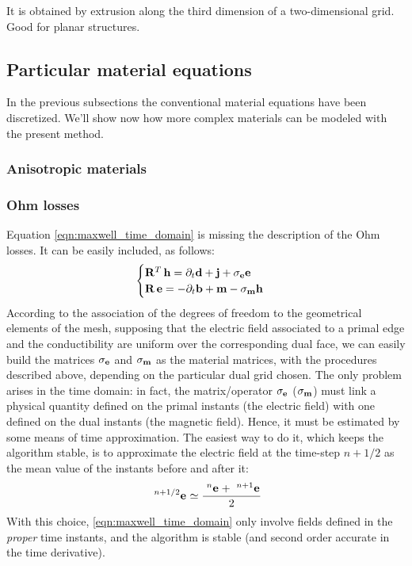 It is obtained by extrusion along the third dimension of a
two-dimensional grid. Good for planar structures.

\subsection{Particular material equations} \label{sec:particular_material_equations}

In the previous subsections the conventional material equations have
been discretized. We'll show now how more complex materials can be
modeled with the present method.

\subsubsection{Anisotropic materials}


\subsubsection{Ohm losses}

Equation \eqref{eqn:maxwell_time_domain} is missing the description of
the Ohm losses. It can be easily included, as follows:
\begin{equation*} \begin{cases}
  \Prod{\Transpose{\Matrix{R}}}{\Array{h}} = \partial_t \Array{d} + \Array{j} + \Matrix{\sigma_e} \Array{e} \\
  \Prod{\Matrix{R}}{\Array{e}} = -\partial_t \Array{b} + \Array{m} - \Matrix{\sigma_m} \Array{h}
\end{cases} \end{equation*}
According to the association of the degrees of freedom to the
geometrical elements of the mesh, supposing that the electric field
associated to a primal edge and the conductibility are uniform over the
corresponding dual face, we can easily build the matrices
$\Matrix{\sigma_e}$ and $\Matrix{\sigma_m}$ as the material matrices,
with the procedures described above, depending on the particular dual
grid chosen. The only problem arises in the time domain: in fact, the
matrix/operator $\Matrix{\sigma_e}$ ($\Matrix{\sigma_m}$) must link a
physical quantity defined on the primal instants (the electric field)
with one defined on the dual instants (the magnetic field). Hence, it
must be estimated by some means of time approximation. The easiest way
to do it, which keeps the algorithm stable, is to approximate the
electric field at the time-step $n+1/2$ as the mean value of the
instants before and after it:
\begin{equation*}
  \Disc{\Array{e}}{}{n+1/2} \simeq \frac{\Disc{\Array{e}}{}{n} + \Disc{\Array{e}}{}{n+1}}{2}
\end{equation*}
With this choice, \eqref{eqn:maxwell_time_domain} only involve fields
defined in the \emph{proper} time instants, and the algorithm is
stable (and second order accurate in the time derivative).

